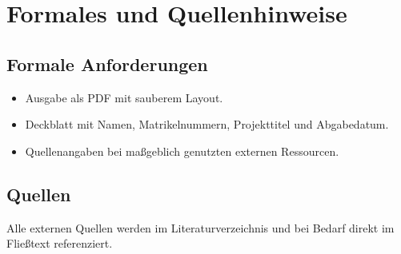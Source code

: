 \section{Formales und Quellenhinweise}

\subsection{Formale Anforderungen}
\begin{itemize}
  \item Ausgabe als PDF mit sauberem Layout.
  \item Deckblatt mit Namen, Matrikelnummern, Projekttitel und Abgabedatum.
  \item Quellenangaben bei maßgeblich genutzten externen Ressourcen.
\end{itemize}

\subsection{Quellen}
Alle externen Quellen werden im Literaturverzeichnis und bei Bedarf direkt im Fließtext referenziert.
